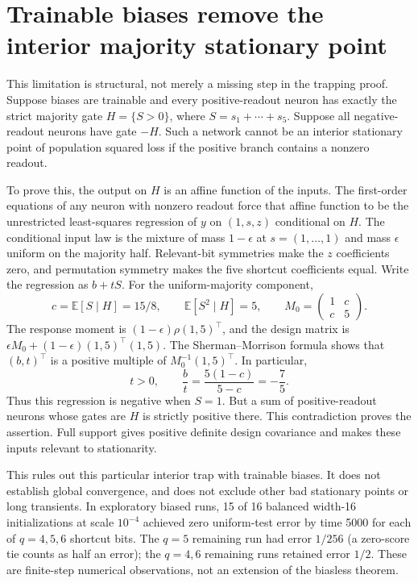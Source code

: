 \documentclass[11pt]{article}
\newcommand{\E}{\mathbb E}\newcommand{\R}{\mathbb R}
\begin{document}
\section{Trainable biases remove the interior majority stationary point}
This limitation is structural, not merely a missing step in the trapping
proof. Suppose biases are trainable and every positive-readout neuron
has exactly the strict majority gate $H=\{S>0\}$, where
$S=s_1+\cdots+s_5$. Suppose all negative-readout neurons have gate
$-H$. Such a network cannot be an interior stationary point of
population squared loss if the positive branch contains a nonzero
readout.

To prove this, the output on $H$ is an affine function of the inputs.
The first-order equations of any neuron with nonzero readout force
that affine function to be the unrestricted least-squares regression
of $y$ on $(1,s,z)$ conditional on $H$. The conditional input law is
the mixture of mass $1-\epsilon$ at $s=(1,\ldots,1)$ and mass
$\epsilon$ uniform on the majority half. Relevant-bit symmetries
make the $z$ coefficients zero, and permutation symmetry makes the
five shortcut coefficients equal. Write the regression as $b+tS$.
For the uniform-majority component,
\[
 c=\E[S\mid H]=15/8,\qquad \E[S^2\mid H]=5,
 \qquad M_0=\begin{pmatrix}1&c\\c&5\end{pmatrix}.
\]
The response moment is $(1-\epsilon)\rho(1,5)^\top$, and the
design matrix is
$\epsilon M_0+(1-\epsilon)(1,5)^\top(1,5)$.
The Sherman--Morrison formula shows that $(b,t)^\top$ is a positive
multiple of $M_0^{-1}(1,5)^\top$. In particular,
\[
 t>0,\qquad \frac bt=\frac{5(1-c)}{5-c}=-\frac75.
\]
Thus this regression is negative when $S=1$. But a sum of
positive-readout neurons whose gates are $H$ is strictly positive
there. This contradiction proves the assertion. Full support gives
positive definite design covariance and makes these inputs relevant
to stationarity.

This rules out this particular interior trap with trainable biases.
It does not establish global convergence, and does not exclude other
bad stationary points or long transients. In exploratory biased runs,
15 of 16 balanced width-16 initializations at scale $10^{-4}$ achieved
zero uniform-test error by time 5000 for each of $q=4,5,6$ shortcut
bits. The $q=5$ remaining run had error $1/256$ (a zero-score tie
counts as half an error); the $q=4,6$
remaining runs retained error $1/2$. These are finite-step numerical
observations, not an extension of the biasless theorem.
\end{document}
